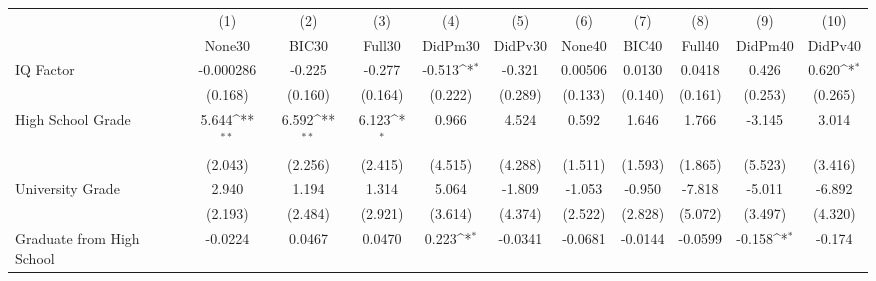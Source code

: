 {
\def\sym#1{\ifmmode^{#1}\else\(^{#1}\)\fi}
\begin{tabular}{l*{10}{c}}
\toprule
            &\multicolumn{1}{c}{(1)}&\multicolumn{1}{c}{(2)}&\multicolumn{1}{c}{(3)}&\multicolumn{1}{c}{(4)}&\multicolumn{1}{c}{(5)}&\multicolumn{1}{c}{(6)}&\multicolumn{1}{c}{(7)}&\multicolumn{1}{c}{(8)}&\multicolumn{1}{c}{(9)}&\multicolumn{1}{c}{(10)}\\
            &\multicolumn{1}{c}{None30}&\multicolumn{1}{c}{BIC30}&\multicolumn{1}{c}{Full30}&\multicolumn{1}{c}{DidPm30}&\multicolumn{1}{c}{DidPv30}&\multicolumn{1}{c}{None40}&\multicolumn{1}{c}{BIC40}&\multicolumn{1}{c}{Full40}&\multicolumn{1}{c}{DidPm40}&\multicolumn{1}{c}{DidPv40}\\
\midrule
IQ Factor   &   -0.000286         &      -0.225         &      -0.277         &      -0.513\sym{*}  &      -0.321         &     0.00506         &      0.0130         &      0.0418         &       0.426         &       0.620\sym{*}  \\
            &     (0.168)         &     (0.160)         &     (0.164)         &     (0.222)         &     (0.289)         &     (0.133)         &     (0.140)         &     (0.161)         &     (0.253)         &     (0.265)         \\
\addlinespace
High School Grade&       5.644\sym{**} &       6.592\sym{**} &       6.123\sym{*}  &       0.966         &       4.524         &       0.592         &       1.646         &       1.766         &      -3.145         &       3.014         \\
            &     (2.043)         &     (2.256)         &     (2.415)         &     (4.515)         &     (4.288)         &     (1.511)         &     (1.593)         &     (1.865)         &     (5.523)         &     (3.416)         \\
\addlinespace
University Grade&       2.940         &       1.194         &       1.314         &       5.064         &      -1.809         &      -1.053         &      -0.950         &      -7.818         &      -5.011         &      -6.892         \\
            &     (2.193)         &     (2.484)         &     (2.921)         &     (3.614)         &     (4.374)         &     (2.522)         &     (2.828)         &     (5.072)         &     (3.497)         &     (4.320)         \\
\addlinespace
Graduate from High School&     -0.0224         &      0.0467         &      0.0470         &       0.223\sym{*}  &     -0.0341         &     -0.0681         &     -0.0144         &     -0.0599         &      -0.158\sym{*}  &      -0.174         \\

\end{tabular}}
